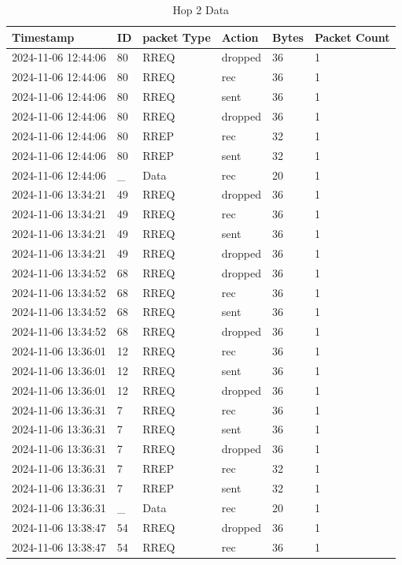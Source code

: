 \documentclass[]{nsm-thesis}
\begin{document}
\begin{longtable}{llllll}
\caption{Hop 2 Data} \label{tab:hop2} \\
\toprule
Timestamp & ID & packet Type & Action & Bytes & Packet Count \\
\midrule
2024-11-06 12:44:06 & 80 & RREQ & dropped & 36 & 1 \\
2024-11-06 12:44:06 & 80 & RREQ & rec & 36 & 1 \\
2024-11-06 12:44:06 & 80 & RREQ & sent & 36 & 1 \\
2024-11-06 12:44:06 & 80 & RREQ & dropped & 36 & 1 \\
2024-11-06 12:44:06 & 80 & RREP & rec & 32 & 1 \\
2024-11-06 12:44:06 & 80 & RREP & sent & 32 & 1 \\
2024-11-06 12:44:06 & _ & Data & rec & 20 & 1 \\
2024-11-06 13:34:21 & 49 & RREQ & dropped & 36 & 1 \\
2024-11-06 13:34:21 & 49 & RREQ & rec & 36 & 1 \\
2024-11-06 13:34:21 & 49 & RREQ & sent & 36 & 1 \\
2024-11-06 13:34:21 & 49 & RREQ & dropped & 36 & 1 \\
2024-11-06 13:34:52 & 68 & RREQ & dropped & 36 & 1 \\
2024-11-06 13:34:52 & 68 & RREQ & rec & 36 & 1 \\
2024-11-06 13:34:52 & 68 & RREQ & sent & 36 & 1 \\
2024-11-06 13:34:52 & 68 & RREQ & dropped & 36 & 1 \\
2024-11-06 13:36:01 & 12 & RREQ & rec & 36 & 1 \\
2024-11-06 13:36:01 & 12 & RREQ & sent & 36 & 1 \\
2024-11-06 13:36:01 & 12 & RREQ & dropped & 36 & 1 \\
2024-11-06 13:36:31 & 7 & RREQ & rec & 36 & 1 \\
2024-11-06 13:36:31 & 7 & RREQ & sent & 36 & 1 \\
2024-11-06 13:36:31 & 7 & RREQ & dropped & 36 & 1 \\
2024-11-06 13:36:31 & 7 & RREP & rec & 32 & 1 \\
2024-11-06 13:36:31 & 7 & RREP & sent & 32 & 1 \\
2024-11-06 13:36:31 & _ & Data & rec & 20 & 1 \\
2024-11-06 13:38:47 & 54 & RREQ & dropped & 36 & 1 \\
2024-11-06 13:38:47 & 54 & RREQ & rec & 36 & 1 \\

\end{longtable}
\end{document}
